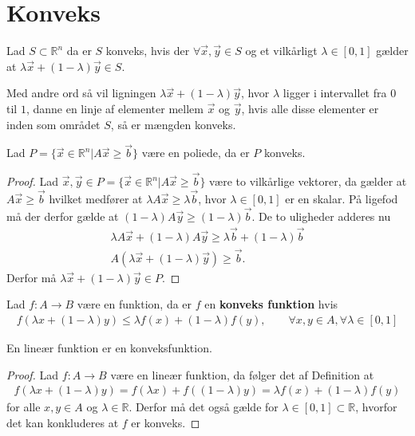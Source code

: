 \section{Konveks}
\begin{defn} 
Lad $S \subset \mathds{R}^n$  da er $S$ konveks, hvis der $\forall \vec{x}, \vec{y} \in S$ og et vilkårligt $\lambda \in [0,1]$ gælder at $\lambda \vec{x} + (1-\lambda) \vec{y} \in S$.
\label{def:Konveks}
\end{defn}
Med andre ord så vil ligningen $\lambda \vec{x} + (1-\lambda) \vec{y}$, hvor $\lambda$ ligger i intervallet fra $0$ til $1$, danne en linje af elementer mellem $\vec{x}$ og $\vec{y}$, hvis alle disse elementer er inden som området $S$, så er mængden konveks.

\begin{stn}
Lad $P =\{ \vec{x} \in \mathds{R}^n | A \vec{x} \geq \vec{b}\} $ være en poliede, da er $P$ konveks.
\label{stn:polykon}
\end{stn}
\begin{proof}
Lad $\vec{x}, \vec{y} \in P=\{ \vec{x} \in \mathds{R}^n | A \vec{x} \geq \vec{b}\}$ være to vilkårlige vektorer, da gælder at $A\vec{x} \geq \vec{b}$ hvilket medfører at $\lambda A \vec{x} \geq \lambda\vec{b}$, hvor $\lambda \in [0,1]$ er en skalar. 
På ligefod må der derfor gælde at $(1-\lambda)A\vec{y} \geq (1-\lambda)\vec{b}$.
De to uligheder adderes nu
\begin{align*}
\lambda A \vec{x} + (1-\lambda) A \vec{y} \geq \lambda \vec{b} + (1 - \lambda) \vec{b}
\\  A (\lambda\vec{x} + (1-\lambda)\vec{y}) \geq \vec{b}.
\end{align*}
Derfor må $\lambda\vec{x} + (1-\lambda)\vec{y} \in P$.
\end{proof}

\begin{defn}
Lad $f:A\to B$ være en funktion, da er $f$ en \textbf{konveks funktion} hvis
\begin{align*}
	f(\lambda x + (1-\lambda) y) \leq \lambda f(x) + (1-\lambda)f(y), \qquad \forall x,y \in A, \forall \lambda \in [0,1]
\end{align*}
\end{defn}

\begin{stn}
En lineær funktion er en konveksfunktion.
\label{stn:funkon}
\end{stn}
\begin{proof}
Lad $f:A\to B$ være en lineær funktion, da følger det af Definition
at 
\begin{align*}
f(\lambda x + (1-\lambda) y)  = f(\lambda x) + f((1-\lambda)y)  = \lambda f(x) + (1-\lambda)f(y)
\end{align*}
for alle $x,y \in A$ og $\lambda \in \mathds{R}$. 
Derfor må det også gælde for $\lambda \in [0,1] \subset \mathds{R}$, hvorfor det kan konkluderes at $f$ er konveks.
\end{proof}

